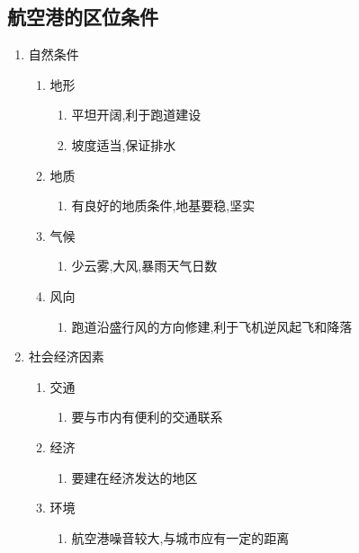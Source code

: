 \documentclass[a4paper]{article}
\begin{document}
    \subsection{航空港的区位条件}
    \begin{enumerate}
        \item 自然条件
        \begin{enumerate}
            \item 地形
            \begin{enumerate}
                \item 平坦开阔,利于跑道建设
                \item 坡度适当,保证排水
            \end{enumerate}
            \item 地质
            \begin{enumerate}
                \item 有良好的地质条件,地基要稳,坚实
            \end{enumerate}
            \item 气候
            \begin{enumerate}
                \item 少云雾,大风,暴雨天气日数
            \end{enumerate}
            \item 风向
            \begin{enumerate}
                \item 跑道沿盛行风的方向修建,利于飞机逆风起飞和降落
            \end{enumerate}
        \end{enumerate}
        \item 社会经济因素
        \begin{enumerate}
            \item 交通
            \begin{enumerate}
                \item 要与市内有便利的交通联系
            \end{enumerate}
            \item 经济
            \begin{enumerate}
                \item 要建在经济发达的地区
            \end{enumerate}
            \item 环境
            \begin{enumerate}
                \item 航空港噪音较大,与城市应有一定的距离
            \end{enumerate}
        \end{enumerate}
    \end{enumerate}
\end{document}
